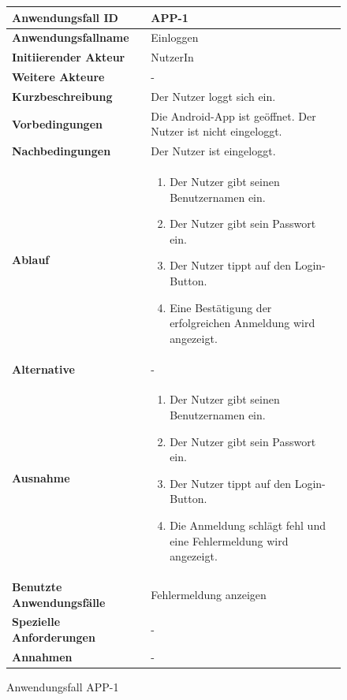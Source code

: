 \newpage

\begin{figure}[h]
	\centering
	\begin{tabularx}{\textwidth}{ X | X }
		\textbf{Anwendungsfall ID} & APP-1 \\ \hline
		\textbf{Anwendungsfallname} & Einloggen \\ \hline
		\textbf{Initiierender Akteur} & NutzerIn \\ \hline
		\textbf{Weitere Akteure} & -  \\ \hline
		\textbf{Kurzbeschreibung} & Der Nutzer loggt sich ein.  \\ \hline
		\textbf{Vorbedingungen} & Die Android-App ist geöffnet. Der Nutzer ist nicht eingeloggt.  \\ \hline
		\textbf{Nachbedingungen} & Der Nutzer ist eingeloggt.  \\ \hline
		\textbf{Ablauf} &
			\begin{enumerate}
				\item Der Nutzer gibt seinen Benutzernamen ein.
				\item Der Nutzer gibt sein Passwort ein.
				\item Der Nutzer tippt auf den Login-Button.
				\item Eine Bestätigung der erfolgreichen Anmeldung wird angezeigt.
			\end{enumerate} \\ \hline
		\textbf{Alternative} &
				- \\ \hline
		\textbf{Ausnahme} &
				\begin{enumerate}
					\item Der Nutzer gibt seinen Benutzernamen ein.
					\item Der Nutzer gibt sein Passwort ein.
					\item Der Nutzer tippt auf den Login-Button.
					\item Die Anmeldung schlägt fehl und eine Fehlermeldung wird angezeigt.
				\end{enumerate}  \\ \hline
		\textbf{Benutzte Anwendungsfälle} & Fehlermeldung anzeigen \\ \hline
		\textbf{Spezielle Anforderungen} & - \\ \hline
		\textbf{Annahmen} & -
	\end{tabularx}
	\caption{Anwendungsfall APP-1}
	\label{fig:anwendungsfall-app-tabelle-APP-1}
\end{figure}

\newpage

